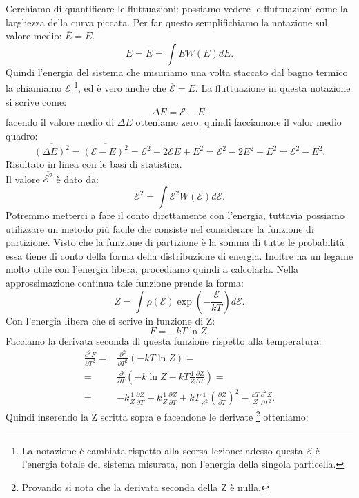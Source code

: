 Cerchiamo di quantificare le fluttuazioni: possiamo vedere le fluttuazioni come la larghezza della curva piccata. Per far questo semplifichiamo la notazione sul valore medio: $\overline{E} = E$.
\[
	E =  \overline{E} = \int E W( E ) dE
.\] 
Quindi l'energia del sistema che misuriamo una volta staccato dal bagno termico la chiamiamo $\mathcal{E}$ \footnote{La notazione è cambiata rispetto alla scorsa lezione: adesso questa $\mathcal{E}$ è l'energia totale del sistema misurata, non l'energia della singola particella.}, ed è vero anche che $\overline{\mathcal{E}}= E$. La fluttuazione in questa notazione si scrive come:
\[
	\Delta E = \mathcal{E}- E 
.\] 
facendo il valore medio di $\Delta E $ otteniamo zero, quindi facciamone il valor medio quadro:
\[
	\overline{\left( \Delta E \right) ^2} = \overline{\left( \mathcal{E} - E \right)^2 } = \overline{\mathcal{E}^2- 2\mathcal{E} E + E^2}= 
	\overline{\mathcal{E}^2} - 2 E^2 + E^2 = \overline{\mathcal{E}^2} - E^2
.\] 
Risultato in linea con le basi di statistica. \\
Il valore $\overline{\mathcal{E}^2}$ è dato da:
\[
	\overline{\mathcal{E}^2} = \int \mathcal{E}^2 W( \mathcal{E}) d\mathcal{E}
.\] 
Potremmo metterci a fare il conto direttamente con l'energia, tuttavia possiamo utilizzare un metodo più facile che consiste nel considerare la funzione di partizione. Visto che la funzione di partizione è la somma di tutte le probabilità essa tiene di conto della forma della distribuzione di energia. Inoltre ha un legame molto utile con l'energia libera, procediamo quindi a calcolarla. Nella approssimazione continua tale funzione prende la forma:
\[
	Z = \int\rho\left( \mathcal{E} \right) \exp\left( -\frac{\mathcal{E}}{kT} \right) d\mathcal{E}
.\] 
Con l'energia libera che si scrive in funzione di Z:
\[
	F = -kT \ln Z
.\]
Facciamo la derivata seconda di questa funzione rispetto alla temperatura:
\begin{align}
	\frac{\partial ^2 F}{\partial T^2} =& \frac{\partial ^2}{\partial T^2} \left( -kT \ln Z \right) =\\
	=&\frac{\partial }{\partial T} \left( -k\ln Z -kT \frac{1}{Z} \frac{\partial Z}{\partial T}  \right) =\\
	=&-k \frac{1}{Z}\frac{\partial Z}{\partial T} 
		- k \frac{1}{Z}\frac{\partial Z}{\partial T} 
		+ kT \frac{1}{Z^2}\left( \frac{\partial Z}{\partial T}  \right) ^2 
		- \frac{kT}{Z}\frac{\partial ^2 Z}{\partial T^2} 
.\end{align}
Quindi inserendo la Z scritta sopra e facendone le derivate \footnote{Provando si nota che la derivata seconda della Z è nulla.} otteniamo:
